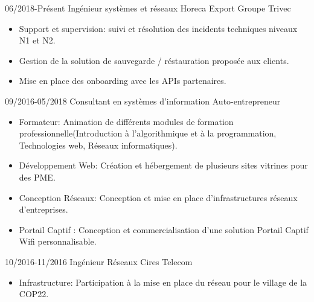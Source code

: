 \documentclass[9pt]{developercv} %
\begin{document}
\vspace{-10 pt}
\begin{entrylist}
	\entry
        {06/2018-Présent}
		{Ingénieur systèmes et réseaux}
		{Horeca Export Groupe Trivec}
		{\vspace{-10pt}
        \begin{itemize}[noitemsep,topsep=0pt,parsep=0pt,partopsep=0pt, leftmargin=-1pt]
            \item Support et supervision: suivi et résolution des incidents techniques niveaux N1 et N2.
            \item Gestion de la solution de sauvegarde / réstauration proposée aux clients.
            \item Mise en place des onboarding avec les APIs partenaires.
        \end{itemize}
        }
	\entry
        {09/2016-05/2018}
		{Consultant en systèmes d’information }
		{Auto-entrepreneur}
		{\vspace{-10pt}
        \begin{itemize}[noitemsep,topsep=0pt,parsep=0pt,partopsep=0pt, leftmargin=-1pt]
            \item Formateur: Animation de différents modules de formation professionnelle(Introduction à l’algorithmique et à la
         programmation, Technologies web, Réseaux informatiques).
            \item Développement Web: Création et hébergement de plusieurs sites vitrines pour des PME.
            \item Conception Réseaux: Conception et mise en place d’infrastructures réseaux d’entreprises.
            \item Portail Captif : Conception et commercialisation d’une solution Portail Captif Wifi personnalisable.
        \end{itemize}
        }
	\entry
        {10/2016-11/2016}
		{Ingénieur Réseaux}
		{Cires Telecom}
		{\vspace{-10pt}
        \begin{itemize}[noitemsep,topsep=0pt,parsep=0pt,partopsep=0pt, leftmargin=-1pt]
            \item Infrastructure: Participation à la mise en place du réseau pour le village de la COP22.

\end{itemize}}
\end{entrylist}
\end{document}
